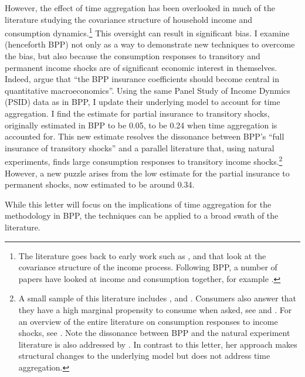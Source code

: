\documentclass[AER]{AEA}
\begin{document}
However, the effect of time aggregation has been overlooked in much of the  literature studying the covariance structure of household income and consumption dynamics.\footnote{The literature goes back to early work such as \cite{hause_1973}, \cite{weiss_1979} and  \cite{macurdy_time_1982} that look at the covariance structure of the income process. Following BPP, a number of papers have looked at income and consumption together, for example \cite{arellano_earnings_2017}.} This oversight can result in significant bias. I examine \cite{blundell_consumption_2008} (henceforth BPP) not only as a way to demonstrate new techniques to overcome the bias, but also because the consumption responses to transitory and permanent income shocks are of significant economic interest in themselves. Indeed, \cite{kaplan_how_2010} argue that ``the BPP insurance coefficients should become central in quantitative macroeconomics''. Using the same Panel Study of Income Dynmics (PSID) data as in BPP, I update their underlying model to account for time aggregation. I find the estimate for partial insurance to transitory shocks, originally estimated in BPP to be 0.05, to be 0.24 when time aggregation is accounted for. This new estimate resolves the dissonance between BPP's ``full insurance of transitory shocks'' and  a parallel literature that, using natural experiments, finds large consumption responses to transitory income shocks.\footnote{A small sample of this literature includes \cite{parker_consumer_2013}, \cite{agarwal_consumption_2014} and \cite{Sahmetal:2008TaxRebates}. Consumers also answer that they have a high marginal propensity to consume when asked, see \cite{fuster_what_2018} and \cite{jappelli_fiscal_2014}. For an overview of the entire literature on consumption responses to income shocks, see \cite{jappelli_consumption_2010}. Note the dissonance between BPP and the natural experiment literature is also addressed by \cite{commault_how_2017}. In contrast to this letter, her approach makes structural changes to the underlying model but does not address time aggregation.} However, a new puzzle arises from the low estimate for the partial insurance to permanent shocks, now estimated to be around 0.34. 

 While this letter will focus on the implications of time aggregation for the methodology in BPP, the techniques can be applied to a broad swath of the literature.
\end{document}
